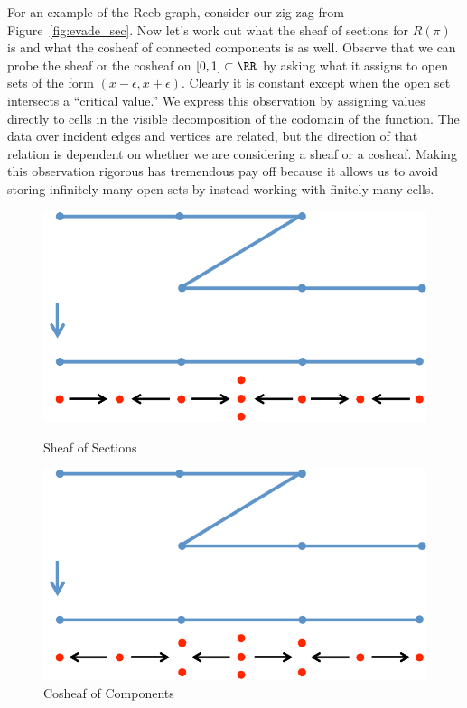For an example of the Reeb graph, consider our zig-zag from Figure~\ref{fig:evade_sec}. Now let's work out what the sheaf of sections for $R(\pi)$ is and what the cosheaf of connected components is as well. Observe that we can probe the sheaf or the cosheaf on $[0,1]\subset\RR$ by asking what it assigns to open sets of the form $(x-\epsilon,x+\epsilon)$. Clearly it is constant except when the open set intersects a ``critical value.'' We express this observation by assigning values directly to cells in the visible decomposition of the codomain of the function. The data over incident edges and vertices are related, but the direction of that relation is dependent on whether we are considering a sheaf or a cosheaf. Making this observation rigorous has tremendous pay off because it allows us to avoid storing infinitely many open sets by instead working with finitely many cells.

\begin{figure}[ht]
\begin{minipage}[b]{0.47\textwidth}
\centering
\includegraphics[scale=.6]{evade_sec_reeb.pdf}
\caption{Sheaf of Sections}
\label{fig:evade_sec_reeb}
\end{minipage}
\hfill
\begin{minipage}[b]{0.47\textwidth}
\centering
\includegraphics[scale=.6]{evade_comp.pdf}
\caption{Cosheaf of Components}
\label{fig:evade_comp}
\end{minipage}
\end{figure}

